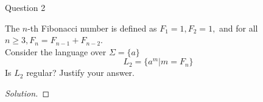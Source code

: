 \begin{solution}{Question 2}\label{ques:2}
    \begin{question}
    The $n$-th Fibonacci number is defined as $F_1 = 1, F_2 = 1,$ and for all $n\geq3,F_n = F_{n-1}+F_{n-2}$.\\
    Consider the language over $\Sigma = \{a\}$
    \begin{equation}
        L_2 = \{a^m | m = F_n\}
    \end{equation}
    Is $L_2$ regular? Justify your answer.
    \end{question}
    \tcblower{}
    \begin{proof}[Solution]
    \end{proof}
\end{solution}
